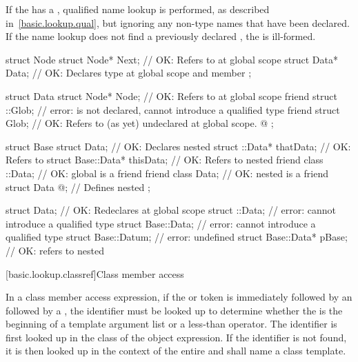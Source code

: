 \pnum
If the  has a
, qualified name lookup is performed, as
described in~\ref{basic.lookup.qual}, but ignoring any non-type names
that have been declared. If the name lookup does not find a previously
declared , the 
is ill-formed. \begin{example}

\begin{codeblock}
struct Node {
  struct Node* Next;            // OK: Refers to  at global scope
  struct Data* Data;            // OK: Declares type  at global scope and member 
};

struct Data {
  struct Node* Node;            // OK: Refers to  at global scope
  friend struct ::Glob;         // error:  is not declared, cannot introduce a qualified type
  friend struct Glob;           // OK: Refers to (as yet) undeclared  at global scope.
  @\commentellip@
};

struct Base {
  struct Data;                  // OK: Declares nested 
  struct ::Data*     thatData;  // OK: Refers to 
  struct Base::Data* thisData;  // OK: Refers to nested 
  friend class ::Data;          // OK: global  is a friend
  friend class Data;            // OK: nested  is a friend
  struct Data { @\commentellip@ };    // Defines nested 
};

struct Data;                    // OK: Redeclares  at global scope
struct ::Data;                  // error: cannot introduce a qualified type
struct Base::Data;              // error: cannot introduce a qualified type
struct Base::Datum;             // error:  undefined
struct Base::Data* pBase;       // OK: refers to nested 
\end{codeblock}
\end{example} %
%

[basic.lookup.classref]{Class member access}

\pnum
{}%
In a class member access expression, if the 
or \tcode{->} token is immediately followed by an 
followed by a \tcode{<}, the identifier must be looked up to determine
whether the \tcode{<} is the beginning of a template argument
list or a less-than operator. The identifier is first
looked up in the class of the object expression.
If the identifier is not found,
it is then looked up in the context of the entire
 and shall name a class template.

